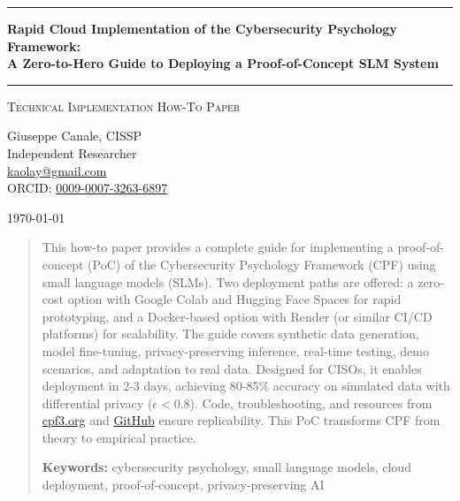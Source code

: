 \documentclass[11pt,a4paper]{article}
\begin{document}
\thispagestyle{empty}
\begin{center}

\vspace*{0.5cm}

\rule{\textwidth}{1.5pt}

\vspace{0.5cm}

{\LARGE \textbf{Rapid Cloud Implementation of the Cybersecurity Psychology Framework:}}\\[0.3cm]
{\LARGE \textbf{A Zero-to-Hero Guide to Deploying a Proof-of-Concept SLM System}}

\vspace{0.5cm}

\rule{\textwidth}{1.5pt}

\vspace{0.3cm}

{\large \textsc{Technical Implementation How-To Paper}}

\vspace{0.5cm}

{\Large Giuseppe Canale, CISSP}\\[0.2cm]
Independent Researcher\\[0.1cm]
\href{mailto:kaolay@gmail.com}{kaolay@gmail.com}\\[0.1cm]
ORCID: \href{https://orcid.org/0009-0007-3263-6897}{0009-0007-3263-6897}

\vspace{0.8cm}

{\large \today}

\vspace{1cm}

\end{center}

\begin{abstract}
\noindent
This how-to paper provides a complete guide for implementing a proof-of-concept (PoC) of the Cybersecurity Psychology Framework (CPF) using small language models (SLMs). Two deployment paths are offered: a zero-cost option with Google Colab and Hugging Face Spaces for rapid prototyping, and a Docker-based option with Render (or similar CI/CD platforms) for scalability. The guide covers synthetic data generation, model fine-tuning, privacy-preserving inference, real-time testing, demo scenarios, and adaptation to real data. Designed for CISOs, it enables deployment in 2-3 days, achieving 80-85\% accuracy on simulated data with differential privacy ($\epsilon < 0.8$). Code, troubleshooting, and resources from \href{https://cpf3.org}{cpf3.org} and \href{https://github.com/xbeat/CPF}{GitHub} ensure replicability. This PoC transforms CPF from theory to empirical practice.

\vspace{0.5em}
\noindent\textbf{Keywords:} cybersecurity psychology, small language models, cloud deployment, proof-of-concept, privacy-preserving AI
\end{abstract}
\end{document}
